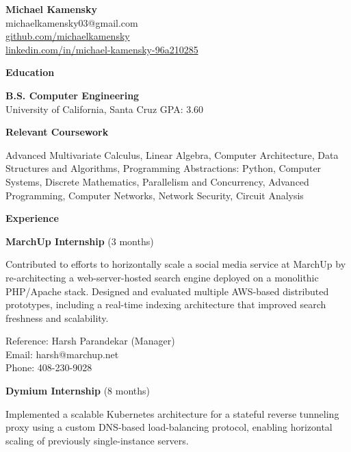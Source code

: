 \documentclass[11pt]{article}
\begin{document}
\begin{center}
{\Large \textbf{Michael Kamensky}} \\
\vspace{4pt}
michaelkamensky03@gmail.com \\
\href{https://github.com/michaelkamensky}{github.com/michaelkamensky} \\
\href{https://linkedin.com/in/michael-kamensky-96a210285}{linkedin.com/in/michael-kamensky-96a210285}
\end{center}

\vspace{10pt}

\textbf{\large Education}

\vspace{4pt}

\textbf{B.S. Computer Engineering} \\
University of California, Santa Cruz \hfill GPA: 3.60

\vspace{4pt}

\textbf{Relevant Coursework}

Advanced Multivariate Calculus, Linear Algebra, Computer Architecture, Data Structures and Algorithms, Programming Abstractions: Python, Computer Systems, Discrete Mathematics, Parallelism and Concurrency, Advanced Programming, Computer Networks, Network Security, Circuit Analysis

\vspace{10pt}

\textbf{\large Experience}

\vspace{6pt}

\textbf{MarchUp Internship} (3 months)

Contributed to efforts to horizontally scale a social media service at MarchUp by re-architecting a web-server-hosted search engine deployed on a monolithic PHP/Apache stack. Designed and evaluated multiple AWS-based distributed prototypes, including a real-time indexing architecture that improved search freshness and scalability.

Reference: Harsh Parandekar (Manager) \\
Email: harsh@marchup.net \\
Phone: 408-230-9028

\vspace{6pt}

\textbf{Dymium Internship} (8 months)

Implemented a scalable Kubernetes architecture for a stateful reverse tunneling proxy using a custom DNS-based load-balancing protocol, enabling horizontal scaling of previously single-instance servers.
\end{document}
